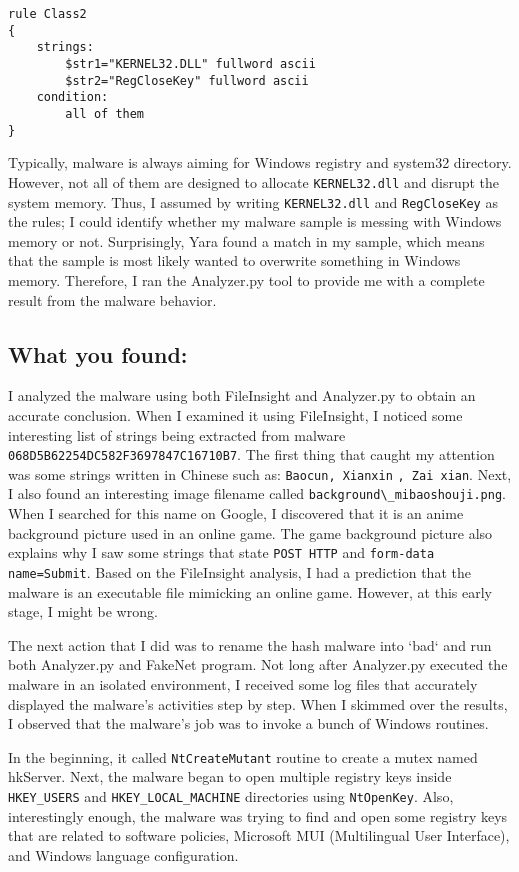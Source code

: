 \documentclass[letterpaper,10pt,titlepage,draftclsnofoot,onecolumn]{IEEEtran}
\begin{document}
\begin{lstlisting}
rule Class2
{
	strings:
		$str1="KERNEL32.DLL" fullword ascii
		$str2="RegCloseKey" fullword ascii
	condition:
		all of them
}
\end{lstlisting}

Typically, malware is always aiming for Windows registry and system32 directory.
However, not all of them are designed to allocate \verb|KERNEL32.dll| and disrupt the system memory. 
Thus, I assumed by writing \verb|KERNEL32.dll| and \verb|RegCloseKey| as the rules; I could identify whether my malware sample is messing with Windows memory or not.
Surprisingly, Yara found a match in my sample, which means that the sample is most likely wanted to overwrite something in Windows memory. 
Therefore, I ran the Analyzer.py tool to provide me with a complete result from the malware behavior.

\subsection{What you found:}
I analyzed the malware using both FileInsight and Analyzer.py to obtain an accurate conclusion.
When I examined it using FileInsight, I noticed some interesting list of strings being extracted from malware \verb|068D5B62254DC582F3697847C16710B7|. 
The first thing that caught my attention was some strings written in Chinese such as: \verb|Baocun, Xianxin| \verb|, Zai xian|.
Next, I also found an interesting image filename called \verb|background\_mibaoshouji.png|. 
When I searched for this name on Google, I discovered that it is an anime background picture used in an online game.
The game background picture also explains why I saw some strings that state \verb|POST HTTP| and \verb|form-data name=Submit|.
Based on the FileInsight analysis, I had a prediction that the malware is an executable file mimicking an online game.
However, at this early stage, I might be wrong.

The next action that I did was to rename the hash malware into `bad` and run both Analyzer.py and FakeNet program.
Not long after Analyzer.py executed the malware in an isolated environment, I received some log files that accurately displayed the malware's activities step by step.
When I skimmed over the results, I observed that the malware's job was to invoke a bunch of Windows routines.

In the beginning, it called \verb|NtCreateMutant| routine to create a mutex named hkServer.
Next, the malware began to open multiple registry keys inside \verb|HKEY_USERS| and \verb|HKEY_LOCAL_MACHINE| directories using \verb|NtOpenKey|.
Also, interestingly enough, the malware was trying to find and open some registry keys that are related to software policies, Microsoft MUI (Multilingual User Interface), and Windows language configuration.
\end{document}
